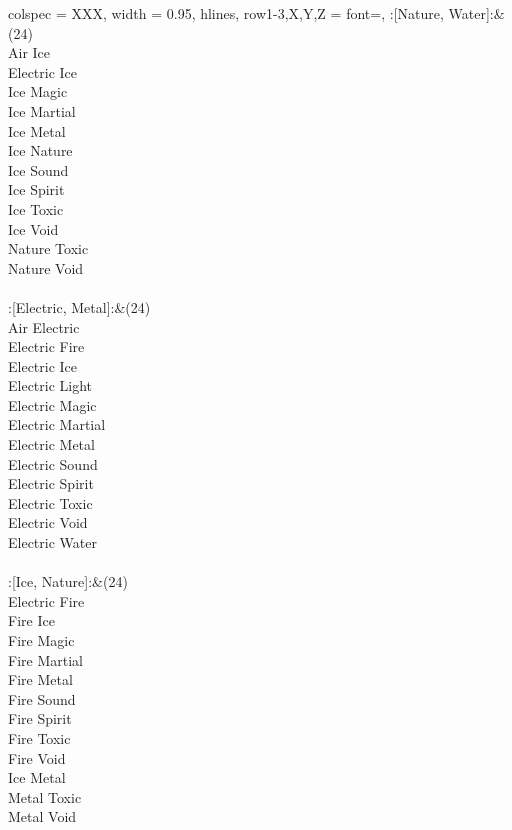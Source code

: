 \begin{longtblr}[
	caption = {2v2 Defending Resisted},
	label = {2v2-Defending-Resisted},
]{
	colspec = {XXX}, width = 0.95\linewidth,
	hlines,
	row{1-3,X,Y,Z} = {font=\bfseries},
}
	:[Nature, Water]:&{(24)\\
	Air Ice \\
	Electric Ice \\
	Ice Magic \\
	Ice Martial \\
	Ice Metal \\
	Ice Nature \\
	Ice Sound \\
	Ice Spirit \\
	Ice Toxic \\
	Ice Void \\
	Nature Toxic \\
	Nature Void \\
	}\\

	:[Electric, Metal]:&{(24)\\
	Air Electric \\
	Electric Fire \\
	Electric Ice \\
	Electric Light \\
	Electric Magic \\
	Electric Martial \\
	Electric Metal \\
	Electric Sound \\
	Electric Spirit \\
	Electric Toxic \\
	Electric Void \\
	Electric Water \\
	}\\

	:[Ice, Nature]:&{(24)\\
	Electric Fire \\
	Fire Ice \\
	Fire Magic \\
	Fire Martial \\
	Fire Metal \\
	Fire Sound \\
	Fire Spirit \\
	Fire Toxic \\
	Fire Void \\
	Ice Metal \\
	Metal Toxic \\
	Metal Void \\
	}\\


\end{longtblr}
